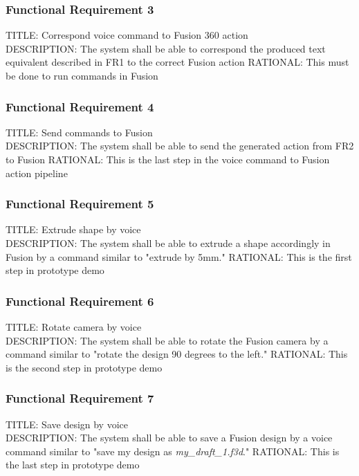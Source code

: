\documentclass[onecolumn, draftclsnofoot,10pt, compsoc]{IEEEtran}
\begin{document}
        \subsubsection{Functional Requirement 3}
        TITLE: Correspond voice command to Fusion 360 action  \\
        DESCRIPTION: The system shall be able to correspond the produced text equivalent described in FR1 to the correct Fusion action
        RATIONAL: This must be done to run commands in Fusion 
        
        \subsubsection{Functional Requirement 4}
        TITLE: Send commands to Fusion  \\
        DESCRIPTION: The system shall be able to send the generated action from FR2 to Fusion
        RATIONAL: This is the last step in the voice command to Fusion action pipeline 
        
        \subsubsection{Functional Requirement 5}
        TITLE: Extrude shape by voice \\
        DESCRIPTION: The system shall be able to extrude a shape accordingly in Fusion by a command similar to "extrude by 5mm."
        RATIONAL: This is the first step in prototype demo 
        
        \subsubsection{Functional Requirement 6}
        TITLE: Rotate camera by voice \\
        DESCRIPTION: The system shall be able to rotate the Fusion camera by a command similar to "rotate the design 90 degrees to the left." 
        RATIONAL: This is the second step in prototype demo 
        
        \subsubsection{Functional Requirement 7}
        TITLE: Save design by voice \\
        DESCRIPTION: The system shall be able to save a Fusion design by a voice command similar to "save my design as \textit{my\_draft\_1.f3d}."
        RATIONAL: This is the last step in prototype demo 
        
\end{document}
